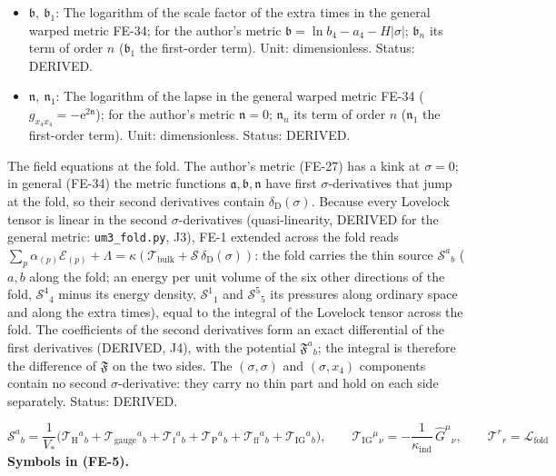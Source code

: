 \documentclass[
  10pt,
]{article}
\begin{document}
\begin{itemize}
  first-order term). Unit: dimensionless. Status: DERIVED.
\item
  \(\mathfrak{b},\ \mathfrak{b}_1\): The logarithm of the scale factor
  of the extra times in the general warped metric FE-34; for the
  author's metric
  \(\mathfrak{b} = \ln b_4 - a_4 - H\lvert\sigma\rvert\);
  \(\mathfrak{b}_n\) its term of order \(n\) (\(\mathfrak{b}_1\) the
  first-order term). Unit: dimensionless. Status: DERIVED.
\item
  \(\mathfrak{n},\ \mathfrak{n}_1\): The logarithm of the lapse in the
  general warped metric FE-34
  (\(g_{x_4x_4} = -\mathrm{e}^{2\mathfrak{n}}\)); for the author's
  metric \(\mathfrak{n} = 0\); \(\mathfrak{n}_n\) its term of order
  \(n\) (\(\mathfrak{n}_1\) the first-order term). Unit: dimensionless.
  Status: DERIVED.
\end{itemize}

The field equations at the fold. The author's metric (FE-27) has a kink
at \(\sigma = 0\); in general (FE-34) the metric functions
\(\mathfrak{a}, \mathfrak{b}, \mathfrak{n}\) have first
\(\sigma\)-derivatives that jump at the fold, so their second
derivatives contain \(\delta_{\mathrm{D}}(\sigma)\). Because every
Lovelock tensor is linear in the second \(\sigma\)-derivatives
(quasi-linearity, DERIVED for the general metric: \texttt{um3\_fold.py},
J3), FE-1 extended across the fold reads
\(\sum_p\alpha_{(p)}\mathcal{E}_{(p)} + \Lambda = \kappa(\mathcal{T}_{\mathrm{bulk}} + \mathcal{S}\,\delta_{\mathrm{D}}(\sigma))\):
the fold carries the thin source \(\mathcal{S}^a{}_b\) (\(a, b\) along
the fold; an energy per unit volume of the six other directions of the
fold, \(\mathcal{S}^4{}_4\) minus its energy density,
\(\mathcal{S}^1{}_1\) and \(\mathcal{S}^5{}_5\) its pressures along
ordinary space and along the extra times), equal to the integral of the
Lovelock tensor across the fold. The coefficients of the second
derivatives form an exact differential of the first derivatives
(DERIVED, J4), with the potential \(\mathfrak{F}^a{}_b\); the integral
is therefore the difference of \(\mathfrak{F}\) on the two sides. The
\((\sigma, \sigma)\) and \((\sigma, x_4)\) components contain no second
\(\sigma\)-derivative: they carry no thin part and hold on each side
separately. Status: DERIVED.

\[
\mathcal{S}^a{}_b = \frac{1}{V_*}\Big(\mathcal{T}_{\mathrm{H}}{}^a{}_b + \mathcal{T}_{\mathrm{gauge}}{}^a{}_b + \mathcal{T}_{\mathrm{f}}{}^a{}_b
 + \mathcal{T}_{\mathrm{P}}{}^a{}_b + \mathcal{T}_{\mathrm{ff}}{}^a{}_b + \mathcal{T}_{\mathrm{IG}}{}^a{}_b\Big),\qquad
\mathcal{T}_{\mathrm{IG}}{}^\mu{}_\nu = -\frac{1}{\kappa_{\mathrm{ind}}}\,\hat G^\mu{}_\nu,\qquad
\mathcal{T}^r{}_r = \mathcal{L}_{\mathrm{fold}} \tag{FE-5}
\] \textbf{Symbols in (FE-5).}
\end{document}
